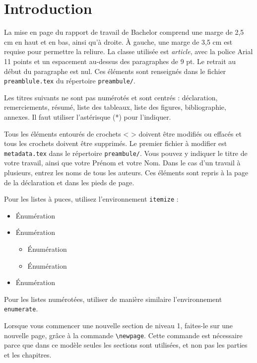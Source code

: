 

\section{Introduction}

La mise en page du rapport de travail de Bachelor comprend une marge de 2,5 cm en haut et en bas, ainsi qu’à droite. À gauche, une marge de 3,5 cm est requise pour permettre la reliure. La classe utilisée est \emph{article}, avec la police Arial 11 points et un espacement au-dessus des paragraphes de 9 pt. Le retrait au début du paragraphe est nul. Ces éléments sont renseignés dans le fichier \texttt{preamblule.tex} du répertoire \texttt{preambule/}.

Les titres suivants ne sont pas numérotés et sont centrés : déclaration, remerciements, résumé, liste des tableaux, liste des figures, bibliographie, annexes. Il faut utiliser l'astérisque (*) pour l'indiquer.

Tous les éléments entourés de crochets < > doivent être modifiés ou effacés et tous les crochets doivent être supprimés. Le premier fichier à modifier est \texttt{metadata.tex} dans le répertoire \texttt{preambule/}. Vous pouvez y indiquer le titre de votre travail, ainsi que votre Prénom et votre Nom. Dans le cas d'un travail à plusieurs, entrez les noms de tous les auteurs. Ces éléments sont repris à la page de la déclaration et dans les pieds de page.

Pour les listes à puces, utilisez l'environnement \texttt{itemize} :

\begin{itemize}[itemsep=0pt]
	\item Énumération
	\item Énumération
	\begin{itemize}[itemsep=0pt]
		\item Énumération
		\item Énumération
	\end{itemize}
	\item Énumération
\end{itemize}

Pour les listes numérotées, utiliser de manière similaire l'environnement \texttt{enumerate}.

Lorsque vous commencer une nouvelle section de niveau 1, faites-le sur une nouvelle page, grâce à la commande \verb?\newpage?. Cette commande est nécessaire parce que dans ce modèle seules les sections sont utilisées, et non pas les parties et les chapitres.

